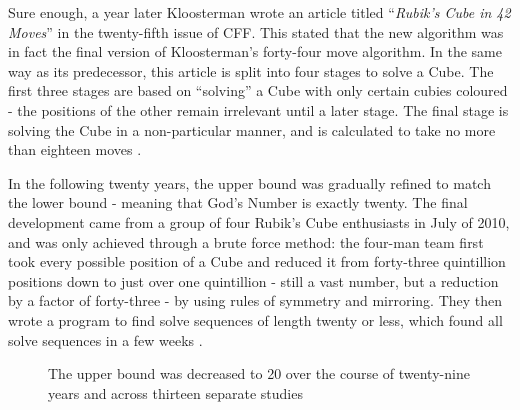 \documentclass{report}
\newcommand{\tit}[1]{\textit{#1}}
\newcommand{\propernoun}[1]{\enquote{\tit{#1}}}
\begin{document}
    Sure enough, a year later Kloosterman wrote an article titled \propernoun{Rubik's Cube in 42 Moves} in the twenty-fifth issue of CFF. This stated that the new algorithm was in fact the final version of Kloosterman's forty-four move algorithm. In the same way as its predecessor, this article is split into four stages to solve a Cube. The first three stages are based on \enquote{solving} a Cube with only certain cubies coloured - the positions of the other remain irrelevant until a later stage. The final stage is solving the Cube in a non-particular manner, and is calculated to take no more than eighteen moves \cite{Kloosterman1990}.
    
    In the following twenty years, the upper bound was gradually refined to match the lower bound - meaning that God's Number is exactly twenty. The final development came from a group of four Rubik's Cube enthusiasts in July of 2010, and was only achieved through a brute force method: the four-man team first took every possible position of a Cube and reduced it from forty-three quintillion positions down to just over one quintillion - still a vast number, but a reduction by a factor of forty-three - by using rules of symmetry and mirroring. They then wrote a program to find solve sequences of length twenty or less, which found all solve sequences in a few weeks \cite{Rokicki2010}.
    
   	\begin{figure}[H]
   		\centering
   		\caption{The upper bound was decreased to 20 over the course of twenty-nine years and across thirteen separate studies \cite{Rokicki2010}}
		\label{fig:godsnumbergraph}
	\end{figure}
\end{document}
